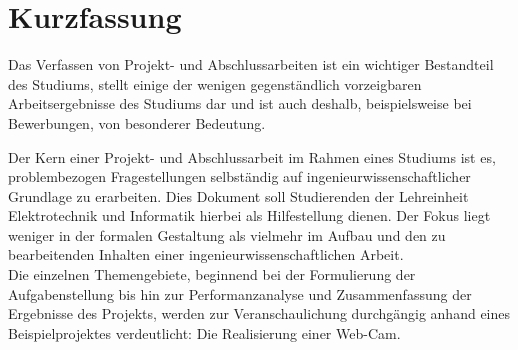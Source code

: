 %
\chapter*{Kurzfassung}
%
\label{sec:Kurzfassung}%
%

Das Verfassen von Projekt- und Abschlussarbeiten ist ein wichtiger Bestandteil des Studiums, stellt einige der wenigen gegenständlich vorzeigbaren Arbeitsergebnisse des Studiums dar und ist auch deshalb, beispielsweise bei Bewerbungen, von besonderer Bedeutung. 

Der Kern einer Projekt- und Abschlussarbeit im Rahmen eines Studiums ist es, problembezogen Fragestellungen selbständig auf ingenieurwissenschaftlicher Grundlage zu erarbeiten. Dies Dokument soll Studierenden der Lehreinheit Elektrotechnik und Informatik hierbei als Hilfestellung dienen. Der Fokus liegt weniger in der formalen Gestaltung als vielmehr im Aufbau und den zu bearbeitenden Inhalten einer ingenieurwissenschaftlichen Arbeit.\\

Die einzelnen Themengebiete, beginnend bei der Formulierung der Aufgabenstellung bis hin zur Performanzanalyse und Zusammenfassung der Ergebnisse des Projekts, werden zur Veranschaulichung durchgängig anhand eines Beispielprojektes verdeutlicht: Die Realisierung einer Web-Cam.






